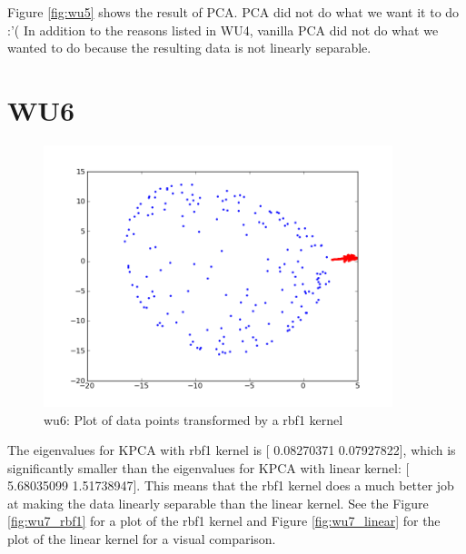 Figure \ref{fig:wu5} shows the result of PCA. 
PCA did not do what we want it to do :'(
In addition to the reasons listed in WU4, vanilla PCA 
did not do what we wanted to do because the resulting data 
is not linearly separable.

\section*{WU6}
\begin{figure}[here]
	\center
	\caption{wu6: Plot of data points transformed by a rbf1 kernel}
	\label{fig:wu6}
	\includegraphics[width=4.0in]{img/wu7_rbf1.png}
\end{figure}

The eigenvalues for KPCA with rbf1 kernel is [ 0.08270371  0.07927822], which is significantly smaller than
the eigenvalues for KPCA with linear kernel: [ 5.68035099  1.51738947]. This means that the rbf1 kernel does a much 
better job at making the data linearly separable than the linear kernel. See the Figure \ref{fig:wu7_rbf1} for a plot of the rbf1 kernel and Figure \ref{fig:wu7_linear} for the plot of the linear kernel for a visual comparison.

